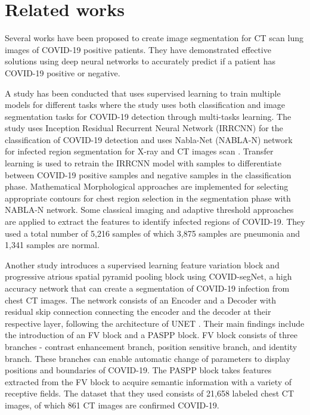 \section{Related works}

Several works have been proposed to create image segmentation for CT scan lung images of COVID-19 positive patients. They have demonstrated effective solutions using deep neural networks to accurately predict if a patient has COVID-19 positive or negative. 

A study has been conducted that uses supervised learning to train multiple models for different tasks where the study uses both classification and image segmentation tasks for COVID-19 detection through multi-tasks learning. The study uses Inception Residual Recurrent Neural Network (IRRCNN) for the classification of COVID-19 detection and uses Nabla-Net (NABLA-N) network for infected region segmentation for X-ray and CT images scan \cite{ref3}. Transfer learning is used to retrain the IRRCNN model with samples to differentiate between COVID-19 positive samples and negative samples in the classification phase. Mathematical Morphological approaches are implemented for selecting appropriate contours for chest region selection in the segmentation phase with NABLA-N network. Some classical imaging and adaptive threshold approaches are applied to extract the features to identify infected regions of COVID-19. They used a total number of 5,216 samples of which 3,875 samples are pneumonia and 1,341 samples are normal.

Another study \cite{ref4} introduces a supervised learning feature variation block and progressive atrious spatial pyramid pooling block using COVID-segNet, a high accuracy network that can create a segmentation of COVID-19 infection from chest CT images. The network consists of an Encoder and a Decoder with residual skip connection connecting the encoder and the decoder at their respective layer, following the architecture of UNET \cite{ref5}. Their main findings include the introduction of an FV block and a PASPP block. FV block consists of three branches - contrast enhancement branch, position sensitive branch, and identity branch. These branches can enable automatic change of parameters to display positions and boundaries of COVID-19. The PASPP block takes features extracted from the FV block to acquire semantic information with a variety of receptive fields. The dataset that they used consists of 21,658 labeled chest CT images, of which 861 CT images are confirmed COVID-19. 


